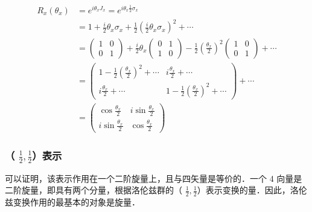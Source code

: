\begin{equation}
\begin{aligned}
R_{x}\left(\theta_{x}\right) &=e^{i \theta_{x} J_{x}}=e^{i \theta_{x} \frac{1}{2} \sigma_{x}} \\
&=1+\frac{i}{2} \theta_{x} \sigma_{x}+\frac{1}{2}\left(\frac{i}{2} \theta_{x} \sigma_{x}\right)^{2}+\cdots \\
&=\left(\begin{array}{cc}
1 & 0 \\
0 & 1
\end{array}\right)+\frac{i}{2} \theta_{x}\left(\begin{array}{cc}
0 & 1 \\
1 & 0
\end{array}\right)-\frac{1}{2}\left(\frac{\theta_{x}}{2}\right)^{2}\left(\begin{array}{cc}
1 & 0 \\
0 & 1
\end{array}\right)+\cdots \\
&=\left(\begin{array}{cc}
1-\frac{1}{2}\left(\frac{\theta_{x}}{2}\right)^{2}+\cdots & i \frac{\theta_{x}}{2}+\cdots \\
i \frac{\theta_{x}}{2}+\cdots & 1-\frac{1}{2}\left(\frac{\theta_{x}}{2}\right)^{2}+\cdots
\end{array}\right)+\cdots \\
&=\left(\begin{array}{cc}
\cos \frac{\theta_{x}}{2} & i \sin \frac{\theta_{x}}{2} \\
i \sin \frac{\theta_{x}}{2} & \cos \frac{\theta_{x}}{2}
\end{array}\right)
\end{aligned}
\end{equation}
\subsubsection{（ $\frac{1}{2},\frac{1}{2}$）表示}
可以证明，该表示作用在一个二阶旋量上，且与四矢量是等价的．一个 4 向量是二阶旋量，即具有两个分量，根据洛伦兹群的（ $\frac{1}{2},\frac{1}{2}$）表示变换的量．因此，洛伦兹变换作用的最基本的对象是旋量．